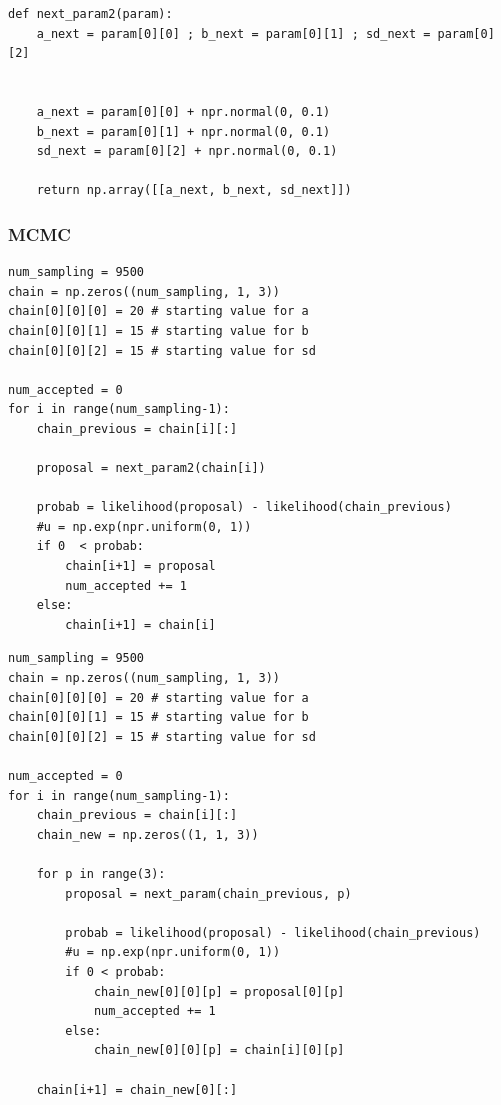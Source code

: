 \documentclass[a4paper,10.5pt,uplatex]{jsarticle}  %
\begin{document}
\begin{lstlisting}[caption={Draw all parameters at the same tine}]
def next_param2(param):
    a_next = param[0][0] ; b_next = param[0][1] ; sd_next = param[0][2]


    a_next = param[0][0] + npr.normal(0, 0.1)
    b_next = param[0][1] + npr.normal(0, 0.1)
    sd_next = param[0][2] + npr.normal(0, 0.1)

    return np.array([[a_next, b_next, sd_next]])
\end{lstlisting}

\subsubsection{MCMC}
\begin{lstlisting}[caption={Component-wise Sampling}]
num_sampling = 9500
chain = np.zeros((num_sampling, 1, 3))
chain[0][0][0] = 20 # starting value for a
chain[0][0][1] = 15 # starting value for b
chain[0][0][2] = 15 # starting value for sd

num_accepted = 0
for i in range(num_sampling-1):
    chain_previous = chain[i][:]
    
    proposal = next_param2(chain[i])

    probab = likelihood(proposal) - likelihood(chain_previous)
    #u = np.exp(npr.uniform(0, 1))
    if 0  < probab:
        chain[i+1] = proposal
        num_accepted += 1
    else:
        chain[i+1] = chain[i]
\end{lstlisting}

\begin{lstlisting}[caption={Block-wise Sampling}]
num_sampling = 9500
chain = np.zeros((num_sampling, 1, 3))
chain[0][0][0] = 20 # starting value for a
chain[0][0][1] = 15 # starting value for b
chain[0][0][2] = 15 # starting value for sd

num_accepted = 0
for i in range(num_sampling-1):
    chain_previous = chain[i][:]
    chain_new = np.zeros((1, 1, 3))
    
    for p in range(3):
        proposal = next_param(chain_previous, p)
        
        probab = likelihood(proposal) - likelihood(chain_previous)
        #u = np.exp(npr.uniform(0, 1))
        if 0 < probab:
            chain_new[0][0][p] = proposal[0][p]
            num_accepted += 1
        else:
            chain_new[0][0][p] = chain[i][0][p]
            
    chain[i+1] = chain_new[0][:]
\end{lstlisting}
\end{document}
